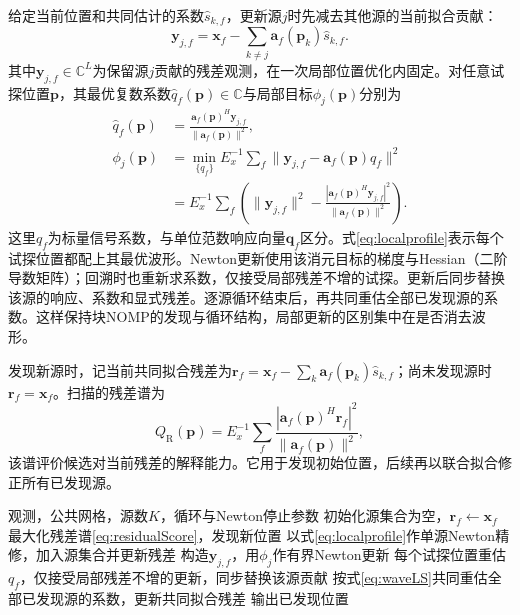 \documentclass[a4paper,fleqn]{cas-sc}
\numberwithin{equation}{section}
\numberwithin{figure}{section}
\numberwithin{table}{section}
\newcommand{\C}{\mathbb C}
\begin{document}
给定当前位置和共同估计的系数$\widehat s_{k,f}$，更新源$j$时先减去其他源的当前拟合贡献：
\begin{equation}
 \bm y_{j,f}=\bm x_f-\sum_{k\ne j}\bm a_f(\bm p_k)\widehat s_{k,f} .
 \label{eq:targetResidual}
\end{equation}
其中$\bm y_{j,f}\in\C^L$为保留源$j$贡献的残差观测，在一次局部位置优化内固定。对任意试探位置$\bm p$，其最优复数系数$\widehat q_f(\bm p)\in\C$与局部目标$\phi_j(\bm p)$分别为
\begin{align}
 \widehat q_f(\bm p)&=\frac{\bm a_f(\bm p)^H\bm y_{j,f}}
 {\|\bm a_f(\bm p)\|^2},\label{eq:localcoef}\\
 \phi_j(\bm p)&=\min_{\{q_f\}}E_x^{-1}\sum_f
 \|\bm y_{j,f}-\bm a_f(\bm p)q_f\|^2\nonumber\\
 &=E_x^{-1}\sum_f\left(\|\bm y_{j,f}\|^2-
 \frac{|\bm a_f(\bm p)^H\bm y_{j,f}|^2}{\|\bm a_f(\bm p)\|^2}\right).
 \label{eq:localprofile}
\end{align}
这里$q_f$为标量信号系数，与单位范数响应向量$\bm q_f$区分。式\eqref{eq:localprofile}表示每个试探位置都配上其最优波形。Newton更新使用该消元目标的梯度与Hessian（二阶导数矩阵）；回溯时也重新求系数，仅接受局部残差不增的试探。更新后同步替换该源的响应、系数和显式残差。逐源循环结束后，再共同重估全部已发现源的系数。这样保持块NOMP的发现与循环结构，局部更新的区别集中在是否消去波形。

发现新源时，记当前共同拟合残差为$\bm r_f=\bm x_f-\sum_k\bm a_f(\bm p_k)\widehat s_{k,f}$；尚未发现源时$\bm r_f=\bm x_f$。扫描的残差谱为
\begin{equation}
 Q_{\mathrm R}(\bm p)=E_x^{-1}\sum_f
 \frac{|\bm a_f(\bm p)^H\bm r_f|^2}{\|\bm a_f(\bm p)\|^2},
 \label{eq:residualScore}
\end{equation}
该谱评价候选对当前残差的解释能力。它用于发现初始位置，后续再以联合拟合修正所有已发现源。

\begin{algorithm}[H]
\caption{波形消元块NOMP}\label{alg:nomp}
\begin{algorithmic}[1]
\Require 观测，公共网格，源数$K$，循环与Newton停止参数
\State 初始化源集合为空，$\bm r_f\gets\bm x_f$
  \State 最大化残差谱\eqref{eq:residualScore}，发现新位置
  \State 以式\eqref{eq:localprofile}作单源Newton精修，加入源集合并更新残差
  \Repeat
      \State 构造$\bm y_{j,f}$，用$\phi_j$作有界Newton更新
      \State 每个试探位置重估$q_f$，仅接受局部残差不增的更新，同步替换该源贡献
    \EndFor
  \State 按式\eqref{eq:waveLS}共同重估全部已发现源的系数，更新共同拟合残差
\EndFor
\State 输出已发现位置
\end{algorithmic}
\end{algorithm}
\end{document}
